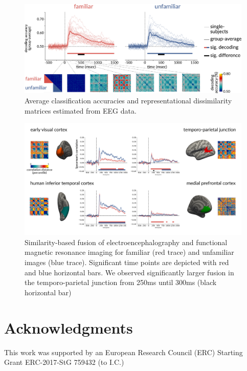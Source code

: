 \documentclass[10pt,letterpaper]{article}
\begin{document}
\begin{figure}[ht]
  \begin{center}
  \includegraphics[width=\linewidth]{figures/figure2.png}
  \end{center}
  \caption{
    Average classification accuracies and representational dissimilarity
    matrices estimated from EEG data.
  } 
  \label{fig2}
  \end{figure}

\begin{figure}[t]
  \begin{center}
  \includegraphics[width=\linewidth]{figures/figure3.png}
  \end{center}
  \caption{
    Similarity-based fusion of electroencephalography and functional magnetic
    resonance imaging for familiar (red trace) and unfamiliar images (blue
    trace). Significant time points are depicted with red and blue horizontal
    bars. We observed significantly larger fusion in the temporo-parietal
    junction from 250ms until 300ms (black horizontal bar)
  } 
  \label{fig3}
  \end{figure}

\section{Acknowledgments}

This work was supported by an European Research Council (ERC) 
Starting Grant ERC-2017-StG 759432 (to I.C.)




\setlength{\bibleftmargin}{.125in}
\setlength{\bibindent}{-\bibleftmargin}


\end{document}
